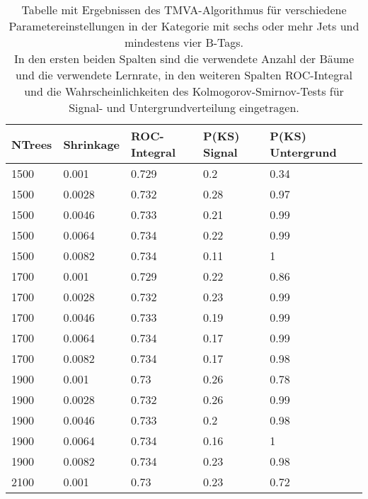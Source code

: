 \begin{table}[tbp]\parbox{12cm}{
  \caption[TMVA 6j4t Ergebnisse]{Tabelle mit Ergebnissen des TMVA-Algorithmus f\"ur verschiedene Parametereinstellungen in der Kategorie mit sechs oder mehr Jets und mindestens vier B-Tags.\\In den ersten beiden Spalten sind die verwendete Anzahl der B\"aume und die verwendete Lernrate, in den weiteren Spalten ROC-Integral und die Wahrscheinlichkeiten des Kolmogorov-Smirnov-Tests f\"ur Signal- und Untergrundverteilung eingetragen.}%
  }
  \label{tab:tmva_6j4t}
  \begin{center}
  \begin{tabular}{lllll}
  \hline
  NTrees & Shrinkage & ROC-Integral & P(KS) Signal & P(KS) Untergrund\\
  \hline
 \num{1500}  & \num{0,001}   & \num{0,729} & \num{0,2}  & \num{0,34}\\
 \num{1500}  & \num{0,0028}  & \num{0,732} & \num{0,28} & \num{0,97}\\
 \num{1500}  & \num{0,0046}  & \num{0,733} & \num{0,21} & \num{0,99}\\
 \num{1500}  & \num{0,0064}  & \num{0,734} & \num{0,22} & \num{0,99}\\
 \num{1500}  & \num{0,0082}  & \num{0,734} & \num{0,11} & \num{1}\\
 \num{1700}  & \num{0,001}   & \num{0,729} & \num{0,22} & \num{0,86}\\
 \num{1700}  & \num{0,0028}  & \num{0,732} & \num{0,23} & \num{0,99}\\
 \num{1700}  & \num{0,0046}  & \num{0,733} & \num{0,19} & \num{0,99}\\
 \num{1700}  & \num{0,0064}  & \num{0,734} & \num{0,17} & \num{0,99}\\
 \num{1700}  & \num{0,0082}  & \num{0,734} & \num{0,17} & \num{0,98}\\
 \num{1900}  & \num{0,001}   & \num{0,73}  & \num{0,26} & \num{0,78}\\
 \num{1900}  & \num{0,0028}  & \num{0,732} & \num{0,26} & \num{0,99}\\
 \num{1900}  & \num{0,0046}  & \num{0,733} & \num{0,2}  & \num{0,98}\\
 \num{1900}  & \num{0,0064}  & \num{0,734} & \num{0,16} & \num{1}\\
 \num{1900}  & \num{0,0082}  & \num{0,734} & \num{0,23} & \num{0,98}\\
 \num{2100}  & \num{0,001}   & \num{0,73}  & \num{0,23} & \num{0,72}\\

\end{tabular}
\end{center}
\end{table}
